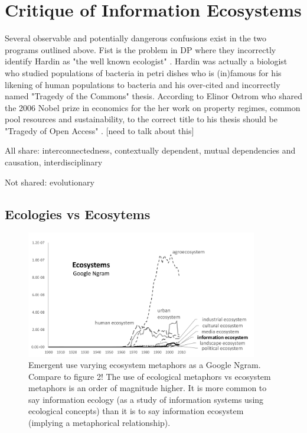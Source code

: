 \section{Critique of Information Ecosystems}

Several observable and potentially dangerous confusions exist in the two programs outlined above. Fist is the problem in DP where they incorrectly identify Hardin as "the well known ecologist" \citep[][p. 28]{davenport_information_1997}. Hardin was actually a biologist who studied populations of bacteria in petri dishes who is (in)famous for his likening of human populations to bacteria and his over-cited and incorrectly named "Tragedy of the Commons" thesis. According to Elinor Ostrom who shared the 2006 Nobel prize in economics for the her work on property regimes, common pool resources and sustainability, to the correct title to his thesis should be "Tragedy of Open Access" \citep{ostrom_2007}. [need to talk about this]

All share: interconnectedness, contextually dependent, mutual dependencies and causation, interdisciplinary

Not shared: evolutionary

\subsection{Ecologies vs Ecosytems}



\begin{figure}[!ht]
  \centering
    \includegraphics[width=0.9\textwidth]{figures/ecosystemsAll}
  \caption{Emergent use varying ecosystem metaphors as a Google Ngram. Compare to figure 2! The use of ecological metaphors vs ecosystem metaphors is an order of magnitude higher. It is more common to say information ecology (as a study of information systems using ecological concepts) than it is to say information ecosystem (implying a metaphorical relationship).}
\end{figure}

